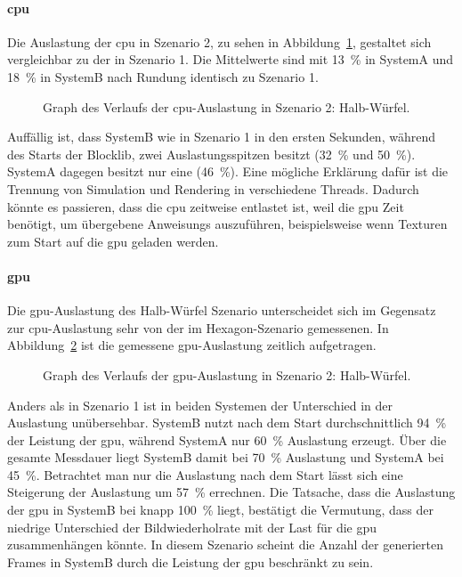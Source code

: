 \paragraph{\ac{cpu}} Die Auslastung der \ac{cpu} in Szenario 2, zu sehen in Abbildung~\ref{fig:seed-0-cube-cpu}, gestaltet sich vergleichbar zu der in Szenario 1. Die Mittelwerte sind mit \SI{13}{\percent} in SystemA und \SI{18}{\percent} in SystemB nach Rundung identisch zu Szenario 1.
\begin{figure}[!htb]
	\caption[Graph des Verlaufs der -Auslastung in Szenario 2: Halb-Würfel.]{Graph des Verlaufs der \ac{cpu}-Auslastung in Szenario 2: Halb-Würfel.}\label{fig:seed-0-cube-cpu}
\end{figure}
Auffällig ist, dass SystemB wie in Szenario 1 in den ersten Sekunden, während des Starts der Blocklib, zwei Auslastungsspitzen besitzt (\SI{32}{\percent} und \SI{50}{\percent}). SystemA dagegen besitzt nur eine (\SI{46}{\percent}). Eine mögliche Erklärung dafür ist die Trennung von Simulation und Rendering in verschiedene Threads. Dadurch könnte es passieren, dass die \ac{cpu} zeitweise  entlastet ist, weil die \ac{gpu} Zeit benötigt, um übergebene \glspl{Anweisung} auszuführen, beispielsweise wenn Texturen zum Start auf die \ac{gpu} geladen werden.

\paragraph{\ac{gpu}} Die \ac{gpu}-Auslastung des Halb-Würfel Szenario unterscheidet sich im Gegensatz zur \ac{cpu}-Auslastung sehr von der im Hexagon-Szenario gemessenen. In Abbildung~\ref{fig:seed-0-cube-gpu} ist die gemessene \ac{gpu}-Auslastung zeitlich aufgetragen. 
\begin{figure}[!htb]
	\caption[Graph des Verlaufs der -Auslastung in Szenario 2: Halb-Würfel.]{Graph des Verlaufs der \ac{gpu}-Auslastung in Szenario 2: Halb-Würfel.}\label{fig:seed-0-cube-gpu}
\end{figure}

Anders als in Szenario 1 ist in beiden Systemen der Unterschied in der Auslastung unübersehbar. SystemB nutzt nach dem Start durchschnittlich \SI{94}{\percent} der Leistung der \ac{gpu}, während SystemA nur \SI{60}{\percent} Auslastung erzeugt. Über die gesamte Messdauer liegt SystemB damit bei \SI{70}{\percent} Auslastung und SystemA bei \SI{45}{\percent}. Betrachtet man nur die Auslastung nach dem Start lässt sich eine Steigerung der Auslastung um \SI{57}{\percent} errechnen. Die Tatsache, dass die Auslastung der \ac{gpu} in SystemB bei knapp \SI{100}{\percent} liegt, bestätigt die Vermutung, dass der niedrige Unterschied der Bildwiederholrate mit der Last für die \ac{gpu} zusammenhängen könnte. In diesem Szenario scheint die Anzahl der generierten Frames in SystemB durch die Leistung der \ac{gpu} beschränkt zu sein. 



